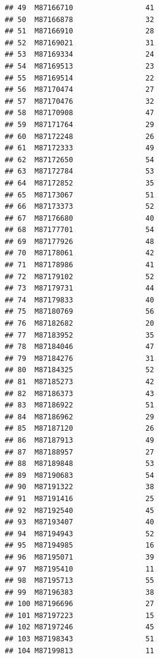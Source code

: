 \documentclass[
  man]{apa6}
\begin{document}
\begin{verbatim}
## 49  M87166710                 41
## 50  M87166878                 32
## 51  M87166910                 28
## 52  M87169021                 31
## 53  M87169334                 24
## 54  M87169513                 23
## 55  M87169514                 22
## 56  M87170474                 27
## 57  M87170476                 32
## 58  M87170908                 47
## 59  M87171764                 29
## 60  M87172248                 26
## 61  M87172333                 49
## 62  M87172650                 54
## 63  M87172784                 53
## 64  M87172852                 35
## 65  M87173067                 51
## 66  M87173373                 52
## 67  M87176680                 40
## 68  M87177701                 54
## 69  M87177926                 48
## 70  M87178061                 42
## 71  M87178986                 41
## 72  M87179102                 52
## 73  M87179731                 44
## 74  M87179833                 40
## 75  M87180769                 56
## 76  M87182682                 20
## 77  M87183952                 35
## 78  M87184046                 47
## 79  M87184276                 31
## 80  M87184325                 52
## 81  M87185273                 42
## 82  M87186373                 43
## 83  M87186922                 51
## 84  M87186962                 29
## 85  M87187120                 26
## 86  M87187913                 49
## 87  M87188957                 27
## 88  M87189848                 53
## 89  M87190683                 54
## 90  M87191322                 38
## 91  M87191416                 25
## 92  M87192540                 45
## 93  M87193407                 40
## 94  M87194943                 52
## 95  M87194985                 16
## 96  M87195071                 39
## 97  M87195410                 11
## 98  M87195713                 55
## 99  M87196383                 38
## 100 M87196696                 27
## 101 M87197223                 15
## 102 M87197246                 45
## 103 M87198343                 51
## 104 M87199813                 11
\end{verbatim}
\end{document}

